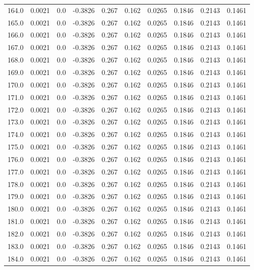 \begin{longtable}{lrrrrrrrrr}
164.0 & 0.0021 & 0.0 & -0.3826 & 0.267 & 0.162 & 0.0265 & 0.1846 & 0.2143 & 0.1461 \\
165.0 & 0.0021 & 0.0 & -0.3826 & 0.267 & 0.162 & 0.0265 & 0.1846 & 0.2143 & 0.1461 \\
166.0 & 0.0021 & 0.0 & -0.3826 & 0.267 & 0.162 & 0.0265 & 0.1846 & 0.2143 & 0.1461 \\
167.0 & 0.0021 & 0.0 & -0.3826 & 0.267 & 0.162 & 0.0265 & 0.1846 & 0.2143 & 0.1461 \\
168.0 & 0.0021 & 0.0 & -0.3826 & 0.267 & 0.162 & 0.0265 & 0.1846 & 0.2143 & 0.1461 \\
169.0 & 0.0021 & 0.0 & -0.3826 & 0.267 & 0.162 & 0.0265 & 0.1846 & 0.2143 & 0.1461 \\
170.0 & 0.0021 & 0.0 & -0.3826 & 0.267 & 0.162 & 0.0265 & 0.1846 & 0.2143 & 0.1461 \\
171.0 & 0.0021 & 0.0 & -0.3826 & 0.267 & 0.162 & 0.0265 & 0.1846 & 0.2143 & 0.1461 \\
172.0 & 0.0021 & 0.0 & -0.3826 & 0.267 & 0.162 & 0.0265 & 0.1846 & 0.2143 & 0.1461 \\
173.0 & 0.0021 & 0.0 & -0.3826 & 0.267 & 0.162 & 0.0265 & 0.1846 & 0.2143 & 0.1461 \\
174.0 & 0.0021 & 0.0 & -0.3826 & 0.267 & 0.162 & 0.0265 & 0.1846 & 0.2143 & 0.1461 \\
175.0 & 0.0021 & 0.0 & -0.3826 & 0.267 & 0.162 & 0.0265 & 0.1846 & 0.2143 & 0.1461 \\
176.0 & 0.0021 & 0.0 & -0.3826 & 0.267 & 0.162 & 0.0265 & 0.1846 & 0.2143 & 0.1461 \\
177.0 & 0.0021 & 0.0 & -0.3826 & 0.267 & 0.162 & 0.0265 & 0.1846 & 0.2143 & 0.1461 \\
178.0 & 0.0021 & 0.0 & -0.3826 & 0.267 & 0.162 & 0.0265 & 0.1846 & 0.2143 & 0.1461 \\
179.0 & 0.0021 & 0.0 & -0.3826 & 0.267 & 0.162 & 0.0265 & 0.1846 & 0.2143 & 0.1461 \\
180.0 & 0.0021 & 0.0 & -0.3826 & 0.267 & 0.162 & 0.0265 & 0.1846 & 0.2143 & 0.1461 \\
181.0 & 0.0021 & 0.0 & -0.3826 & 0.267 & 0.162 & 0.0265 & 0.1846 & 0.2143 & 0.1461 \\
182.0 & 0.0021 & 0.0 & -0.3826 & 0.267 & 0.162 & 0.0265 & 0.1846 & 0.2143 & 0.1461 \\
183.0 & 0.0021 & 0.0 & -0.3826 & 0.267 & 0.162 & 0.0265 & 0.1846 & 0.2143 & 0.1461 \\
184.0 & 0.0021 & 0.0 & -0.3826 & 0.267 & 0.162 & 0.0265 & 0.1846 & 0.2143 & 0.1461 \\

\end{longtable}
